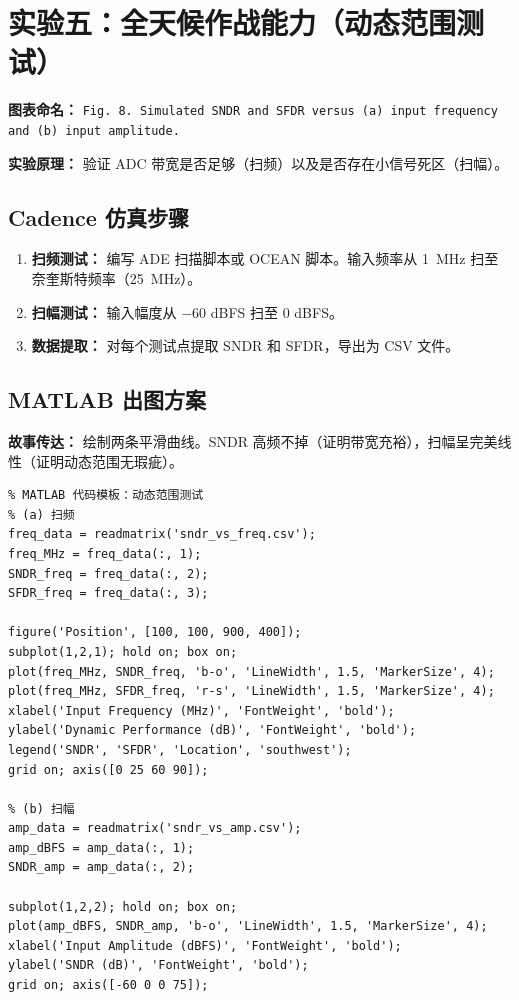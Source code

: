 \documentclass[11pt,a4paper,UTF8]{ctexart}
\begin{document}
\section{实验五：全天候作战能力（动态范围测试）}

\textbf{图表命名：} \texttt{Fig. 8. Simulated SNDR and SFDR versus (a) input frequency and (b) input amplitude.}

\textbf{实验原理：} 验证 ADC 带宽是否足够（扫频）以及是否存在小信号死区（扫幅）。

\subsection{Cadence 仿真步骤}

\begin{enumerate}[leftmargin=*]
    \item \textbf{扫频测试：} 编写 ADE 扫描脚本或 OCEAN 脚本。输入频率从 \SI{1}{\mega\hertz} 扫至奈奎斯特频率（\SI{25}{\mega\hertz}）。
    
    \item \textbf{扫幅测试：} 输入幅度从 $-60$ dBFS 扫至 0 dBFS。
    
    \item \textbf{数据提取：} 对每个测试点提取 SNDR 和 SFDR，导出为 CSV 文件。
\end{enumerate}

\subsection{MATLAB 出图方案}

\textbf{故事传达：} 绘制两条平滑曲线。SNDR 高频不掉（证明带宽充裕），扫幅呈完美线性（证明动态范围无瑕疵）。

\begin{lstlisting}
% MATLAB 代码模板：动态范围测试
% (a) 扫频
freq_data = readmatrix('sndr_vs_freq.csv');
freq_MHz = freq_data(:, 1);
SNDR_freq = freq_data(:, 2);
SFDR_freq = freq_data(:, 3);

figure('Position', [100, 100, 900, 400]);
subplot(1,2,1); hold on; box on;
plot(freq_MHz, SNDR_freq, 'b-o', 'LineWidth', 1.5, 'MarkerSize', 4);
plot(freq_MHz, SFDR_freq, 'r-s', 'LineWidth', 1.5, 'MarkerSize', 4);
xlabel('Input Frequency (MHz)', 'FontWeight', 'bold');
ylabel('Dynamic Performance (dB)', 'FontWeight', 'bold');
legend('SNDR', 'SFDR', 'Location', 'southwest');
grid on; axis([0 25 60 90]);

% (b) 扫幅
amp_data = readmatrix('sndr_vs_amp.csv');
amp_dBFS = amp_data(:, 1);
SNDR_amp = amp_data(:, 2);

subplot(1,2,2); hold on; box on;
plot(amp_dBFS, SNDR_amp, 'b-o', 'LineWidth', 1.5, 'MarkerSize', 4);
xlabel('Input Amplitude (dBFS)', 'FontWeight', 'bold');
ylabel('SNDR (dB)', 'FontWeight', 'bold');
grid on; axis([-60 0 0 75]);
\end{lstlisting}
\end{document}
